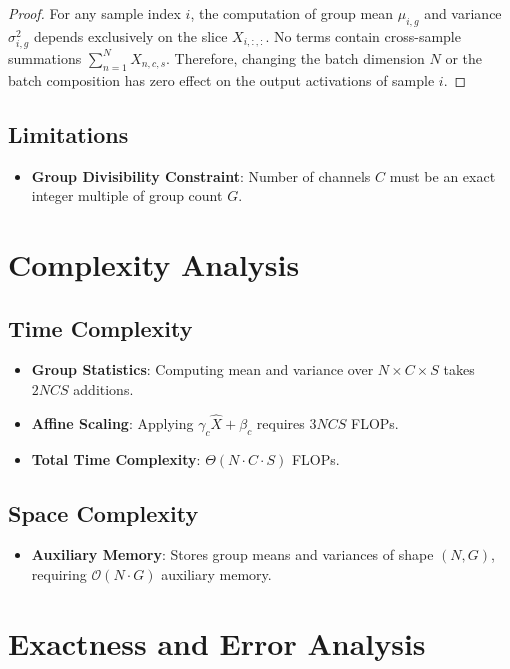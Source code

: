 \documentclass[11pt,a4paper]{article}
\theoremstyle{definition}
\begin{document}
\begin{proof}
For any sample index $i$, the computation of group mean $\mu_{i, g}$ and variance $\sigma_{i, g}^2$ depends exclusively on the slice $X_{i, :, :}$. No terms contain cross-sample summations $\sum_{n=1}^N X_{n, c, s}$. Therefore, changing the batch dimension $N$ or the batch composition has zero effect on the output activations of sample $i$.
\end{proof}

\subsection{Limitations}
\begin{itemize}
    \item \textbf{Group Divisibility Constraint}: Number of channels $C$ must be an exact integer multiple of group count $G$.
\end{itemize}

\section{Complexity Analysis}

\subsection{Time Complexity}
\begin{itemize}
    \item \textbf{Group Statistics}: Computing mean and variance over $N \times C \times S$ takes $2 N C S$ additions.
    \item \textbf{Affine Scaling}: Applying $\gamma_c \hat{X} + \beta_c$ requires $3 N C S$ FLOPs.
    \item \textbf{Total Time Complexity}: $\Theta(N \cdot C \cdot S)$ FLOPs.
\end{itemize}

\subsection{Space Complexity}
\begin{itemize}
    \item \textbf{Auxiliary Memory}: Stores group means and variances of shape $(N, G)$, requiring $\mathcal{O}(N \cdot G)$ auxiliary memory.
\end{itemize}

\section{Exactness and Error Analysis}
\end{document}
